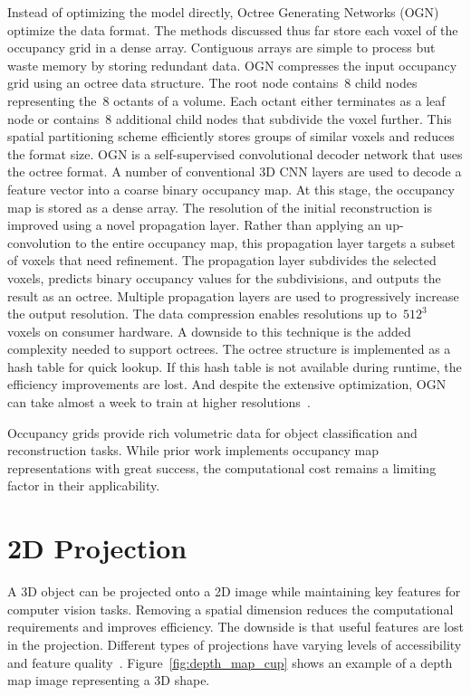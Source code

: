 Instead of optimizing the model directly, Octree Generating Networks (OGN)~\cite{Tatarchenko2017} optimize the data format. The methods discussed thus far store each voxel of the occupancy grid in a dense array. Contiguous arrays are simple to process but waste memory by storing redundant data. OGN compresses the input occupancy grid using an octree data structure. The root node contains~8 child nodes representing the~8 octants of a volume. Each octant either terminates as a leaf node or contains~8 additional child nodes that subdivide the voxel further. This spatial partitioning scheme efficiently stores groups of similar voxels and reduces the format size. OGN is a self-supervised convolutional decoder network that uses the octree format. A number of conventional 3D CNN layers are used to decode a feature vector into a coarse binary occupancy map. At this stage, the occupancy map is stored as a dense array. The resolution of the initial reconstruction is improved using a novel propagation layer. Rather than applying an up-convolution to the entire occupancy map, this propagation layer targets a subset of voxels that need refinement. The propagation layer subdivides the selected voxels, predicts binary occupancy values for the subdivisions, and outputs the result as an octree. Multiple propagation layers are used to progressively increase the output resolution. The data compression enables resolutions up to~$512^3$ voxels on consumer hardware. A downside to this technique is the added complexity needed to support octrees. The octree structure is implemented as a hash table for quick lookup. If this hash table is not available during runtime, the efficiency improvements are lost. And despite the extensive optimization, OGN can take almost a week to train at higher resolutions~\cite{Tatarchenko2017}.

Occupancy grids provide rich volumetric data for object classification and reconstruction tasks. While prior work implements occupancy map representations with great success, the computational cost remains a limiting factor in their applicability.


\section{2D Projection}
\label{sec:2d_projection}

A 3D object can be projected onto a 2D image while maintaining key features for computer vision tasks. Removing a spatial dimension reduces the computational requirements and improves efficiency. The downside is that useful features are lost in the projection. Different types of projections have varying levels of accessibility and feature quality~\cite{Ahmed2018}. Figure~\ref{fig:depth_map_cup} shows an example of a depth map image representing a 3D shape.


